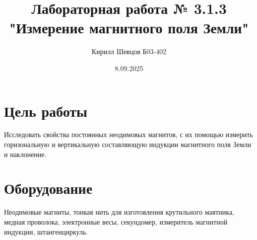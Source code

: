 \documentclass[a4paper, 12pt]{article}
\title{Лабораторная работа № 3.1.3 "Измерение магнитного поля Земли"}
\author{Кирилл Шевцов Б03-402}
\date{8.09.2025}
\begin{document}
\maketitle
\section*{Цель работы}
Исследовать свойства постоянных неодимовых магнитов, с их помощью измерить горизональную и вертикальную составляющую индукции магнитного поля Земли и наклонение.
\section*{Оборудование}
Неодимовые магниты, тонкая нить для изготовления крутильного маятника, медная проволока, электронные весы, секундомер, измеритель магнитной индукции, штангенциркуль.
\end{document}
